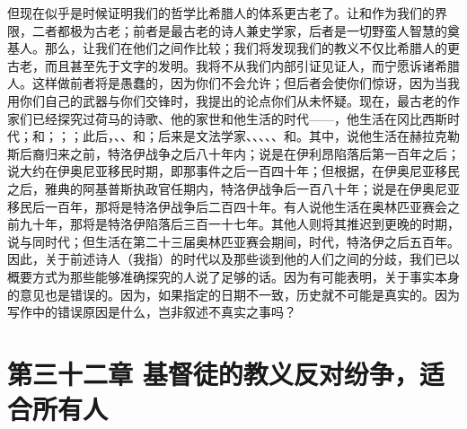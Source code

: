 但现在似乎是时候证明我们的哲学比希腊人的体系更古老了。让和作为我们的界限，二者都极为古老；前者是最古老的诗人兼史学家，后者是一切野蛮人智慧的奠基人。那么，让我们在他们之间作比较；我们将发现我们的教义不仅比希腊人的更古老，而且甚至先于文字的发明。我将不从我们内部引证见证人，而宁愿诉诸希腊人。这样做前者将是愚蠢的，因为你们不会允许；但后者会使你们惊讶，因为当我用你们自己的武器与你们交锋时，我提出的论点你们从未怀疑。现在，最古老的作家们已经探究过荷马的诗歌、他的家世和他生活的时代——，他生活在冈比西斯时代；和；；；此后，、、和；后来是文法学家、、、、、和。其中，说他生活在赫拉克勒斯后裔归来之前，特洛伊战争之后八十年内；说是在伊利昂陷落后第一百年之后；说大约在伊奥尼亚移民时期，即那事件之后一百四十年；但根据，在伊奥尼亚移民之后，雅典的阿基普斯执政官任期内，特洛伊战争后一百八十年；说是在伊奥尼亚移民后一百年，那将是特洛伊战争后二百四十年。有人说他生活在奥林匹亚赛会之前九十年，那将是特洛伊陷落后三百一十七年。其他人则将其推迟到更晚的时期，说与同时代；但生活在第二十三届奥林匹亚赛会期间，时代，特洛伊之后五百年。因此，关于前述诗人（我指）的时代以及那些谈到他的人们之间的分歧，我们已以概要方式为那些能够准确探究的人说了足够的话。因为有可能表明，关于事实本身的意见也是错误的。因为，如果指定的日期不一致，历史就不可能是真实的。因为写作中的错误原因是什么，岂非叙述不真实之事吗？\par


\section{第三十二章 基督徒的教义反对纷争，适合所有人}


